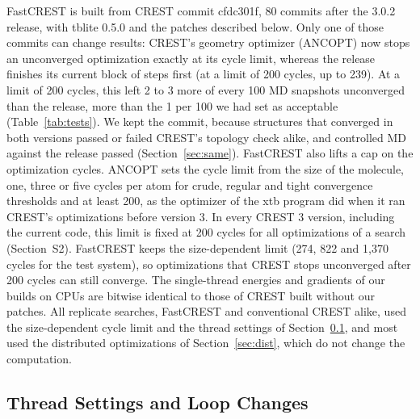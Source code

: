 \documentclass[journal=jctcce,manuscript=article]{achemso}
\begin{document}
FastCREST is built from CREST commit cfdc301f,\cite{crestcfdc301f} 80 commits after the 3.0.2 release, with tblite 0.5.0\cite{tblite} and the patches described below. Only one of those commits can change results: CREST's geometry optimizer (ANCOPT) now stops an unconverged optimization exactly at its cycle limit, whereas the release finishes its current block of steps first (at a limit of 200 cycles, up to 239). At a limit of 200 cycles, this left 2 to 3 more of every 100 MD snapshots unconverged than the release, more than the 1 per 100 we had set as acceptable (Table~\ref{tab:tests}). We kept the commit, because structures that converged in both versions passed or failed CREST's topology check alike, and controlled MD against the release passed (Section~\ref{sec:same}). FastCREST also lifts a cap on the optimization cycles. ANCOPT sets the cycle limit from the size of the molecule, one, three or five cycles per atom for crude, regular and tight convergence thresholds and at least 200, as the optimizer of the xtb program did when it ran CREST's optimizations before version 3. In every CREST 3 version, including the current code, this limit is fixed at 200 cycles for all optimizations of a search (Section~S2). FastCREST keeps the size-dependent limit (274, 822 and 1,370 cycles for the test system), so optimizations that CREST stops unconverged after 200 cycles can still converge. The single-thread energies and gradients of our builds on CPUs are bitwise identical to those of CREST built without our patches. All replicate searches, FastCREST and conventional CREST alike, used the size-dependent cycle limit and the thread settings of Section~\ref{sec:threads}, and most used the distributed optimizations of Section~\ref{sec:dist}, which do not change the computation.

\subsection{Thread Settings and Loop Changes}
\label{sec:threads}
\end{document}
